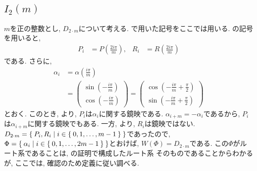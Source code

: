 \subsection{$I_2(m)$}
\label{ex:i2m:root}
$m$を正の整数とし,
$D_{2\cdot m}$について考える.
で用いた記号をここでは用いる.
の記号を用いると,
\begin{align*}
  P_i
  &=P\left(\frac{2i\pi}{m}\right),&
  R_i
  &=R\left(\frac{2i\pi}{m}\right)
\end{align*}
である. さらに,
\begin{align*}
  \alpha_i&=\alpha\left(\frac{i\pi}{m}\right)\\
  &=
  \begin{pmatrix}
    \sin(-\frac{i\pi}{m})\\
    \cos(-\frac{i\pi}{m})
  \end{pmatrix}
  =
  \begin{pmatrix}
    \cos(-\frac{i\pi}{m}+\frac{\pi}{2})\\
    \sin(-\frac{i\pi}{m}+\frac{\pi}{2})
  \end{pmatrix} 
\end{align*}
とおく. 
このとき,
より, $P_i$は$\alpha_i$に関する鏡映である.
$\alpha_{i+m}=-\alpha_i$であるから,  $P_i$は$\alpha_{i+m}$に関する鏡映でもある.
一方, より, $R_i$は鏡映ではない.
$D_{2\cdot m}=\Set{P_i,R_i|i \in \Set{0,1,\ldots,m-1}}$であったので,
$\Phi=\Set{\alpha_i | i \in \Set{0,1,\ldots,2m-1} }$とおけば,
$W(\Phi)=D_{2\cdot m}$である.
この$\Phi$がルート系であることは,
の証明で構成したルート系
そのものであることからわかるが,
ここでは, 確認のため定義に従い調べる.
